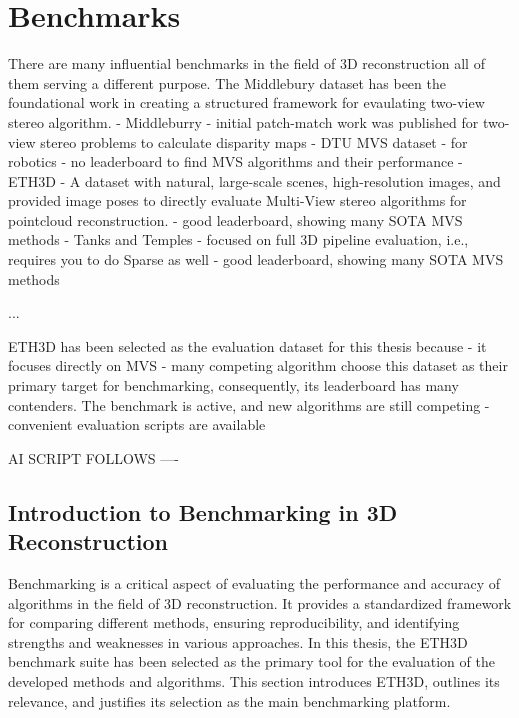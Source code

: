 \chapter{Benchmarks}
\label{ch:benchmarks}

There are many influential benchmarks in the field of 3D reconstruction all of them serving a different purpose. The Middlebury dataset \cite{middleburry_dataset} has been the foundational work in creating a structured framework for evaulating two-view stereo algorithm.
- Middleburry
    - initial patch-match work was published for two-view stereo problems to calculate disparity maps 
- DTU MVS dataset \cite{dtu_dataset}
    - for robotics
    - no leaderboard to find MVS algorithms and their performance
- ETH3D \cite{eth3d_dataset}
    - A dataset with natural, large-scale scenes, high-resolution images, and provided image poses to directly evaluate Multi-View stereo algorithms for pointcloud reconstruction.
    - good leaderboard, showing many SOTA MVS methods
- Tanks and Temples \cite{tanks_and_temples_dataset}
    - focused on full 3D pipeline evaluation, i.e., requires you to do Sparse as well
    - good leaderboard, showing many SOTA MVS methods

...

ETH3D has been selected as the evaluation dataset for this thesis because
- it focuses directly on MVS
- many competing algorithm choose this dataset as their primary target for benchmarking, consequently, its leaderboard has many contenders. The benchmark is active, and new algorithms are still competing 
- convenient evaluation scripts are available


AI SCRIPT FOLLOWS
----

\section{Introduction to Benchmarking in 3D Reconstruction}

Benchmarking is a critical aspect of evaluating the performance and accuracy of algorithms in the field of 3D reconstruction. It provides a standardized framework for comparing different methods, ensuring reproducibility, and identifying strengths and weaknesses in various approaches. In this thesis, the ETH3D benchmark suite has been selected as the primary tool for the evaluation of the developed methods and algorithms. This section introduces ETH3D, outlines its relevance, and justifies its selection as the main benchmarking platform.

